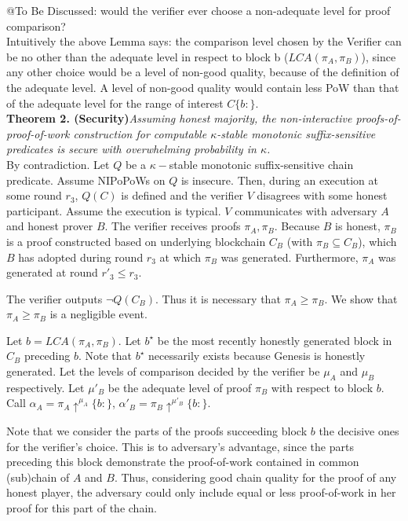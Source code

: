 \documentclass[9pt,a4paper]{article}
\begin{document}
@To Be Discussed: would the verifier ever choose a non-adequate level for proof comparison? \\
Intuitively the above Lemma says: the comparison level chosen by the Verifier can be no other than the adequate level in respect to block b ($LCA(\pi_A, \pi_B)$), since any other choice would be a level of non-good quality, because of the definition of the adequate level. A level of non-good quality would contain less PoW than that of the adequate level for the range of interest $C\{b:\}$. \\


\textbf{Theorem 2. (Security)}\textit{Assuming honest majority, the non-interactive proofs-of-proof-of-work construction for computable $\kappa$-stable monotonic suffix-sensitive predicates is secure with overwhelming probability in $\kappa$.}\\

By contradiction. Let $Q$ be a $\kappa-$stable monotonic suffix-sensitive chain predicate. Assume NIPoPoWs on $Q$ is insecure. Then, during an execution at some round  $r_3$, $Q(C)$ is defined and the verifier $V$ disagrees with some honest participant. Assume the execution is typical. $V$ communicates with adversary $A$ and honest prover $B$. The verifier receives proofs $\pi_A, \pi_B$. Because $B$ is honest, $\pi_B$ is a proof constructed based on underlying blockchain $C_B$ (with $\pi_B \subseteq C_B$), which $B$ has adopted during round $r_3$ at which $\pi_B$ was generated. Furthermore, $\pi_A$ was generated at round $r'_3 \leq r_3$.

The verifier outputs $\neg Q(C_B)$. Thus it is necessary that $\pi_A \geq \pi_B$. We show that $\pi_A \geq \pi_B$ is a negligible event. 

Let $b = LCA(\pi_A, \pi_B)$. Let $b^\star$ be the most recently honestly generated block in $C_B$ preceding $b$. Note that $b^\star$ necessarily exists because Genesis is honestly generated. Let the levels of comparison decided by the verifier be $\mu_A$ and $\mu_B$ respectively. Let $\mu'_B$ be the adequate level of proof $\pi_B$  with respect to block $b$. Call $\alpha_A = \pi_A \uparrow^{\mu_A}\{b:\}$, 
$\alpha'_B = \pi_B \uparrow^{\mu'_B}\{b:\}$.

Note that we consider the parts of the proofs succeeding block $b$ the decisive ones for the verifier's choice. This is to adversary's advantage, since the parts preceding this block demonstrate the proof-of-work contained in common (sub)chain of $A$ and $B$. Thus, considering good chain quality for the proof of any honest player, the adversary could only include equal or less proof-of-work in her proof for this part of the chain.
\end{document}
